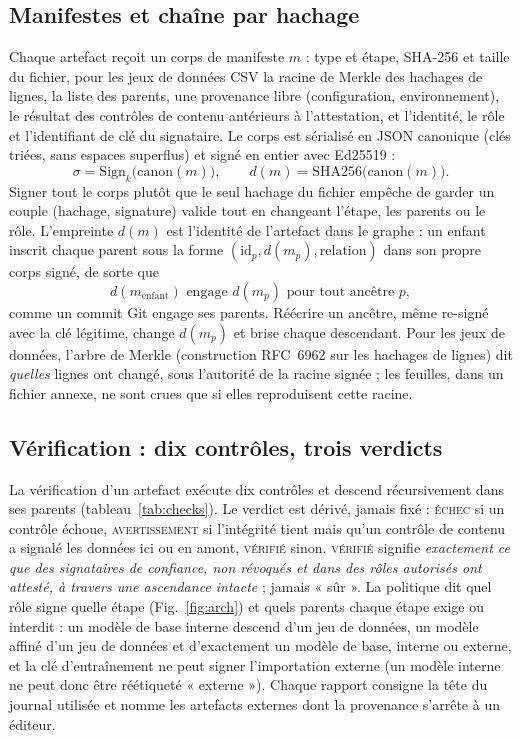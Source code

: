 \documentclass[conference]{IEEEtran}
\newcommand{\st}[1]{\textsc{#1}}
\begin{document}
\subsection{Manifestes et chaîne par hachage}
Chaque artefact reçoit un corps de manifeste $m$ : type et étape, SHA-256 et taille du fichier, pour les jeux de données CSV la racine de Merkle des hachages de lignes, la liste des parents, une provenance libre (configuration, environnement), le résultat des contrôles de contenu antérieurs à l'attestation, et l'identité, le rôle et l'identifiant de clé du signataire. Le corps est sérialisé en JSON canonique (clés triées, sans espaces superflus) et signé en entier avec Ed25519 \cite{rfc8032} :
\begin{equation}
\sigma = \mathrm{Sign}_{k}\bigl(\mathrm{canon}(m)\bigr),\qquad
d(m) = \mathrm{SHA256}\bigl(\mathrm{canon}(m)\bigr).
\label{eq:sign}
\end{equation}
Signer tout le corps plutôt que le seul hachage du fichier empêche de garder un couple (hachage, signature) valide tout en changeant l'étape, les parents ou le rôle. L'empreinte $d(m)$ est l'identité de l'artefact dans le graphe : un enfant inscrit chaque parent sous la forme $(\mathrm{id}_p, d(m_p), \mathrm{relation})$ dans son propre corps signé, de sorte que
\begin{equation}
d(m_{\mathrm{enfant}}) \text{ engage } d(m_p) \text{ pour tout ancêtre } p,
\label{eq:chain}
\end{equation}
comme un commit Git engage ses parents. Réécrire un ancêtre, même re-signé avec la clé légitime, change $d(m_p)$ et brise chaque descendant. Pour les jeux de données, l'arbre de Merkle (construction RFC~6962 \cite{rfc6962} sur les hachages de lignes) dit \emph{quelles} lignes ont changé, sous l'autorité de la racine signée ; les feuilles, dans un fichier annexe, ne sont crues que si elles reproduisent cette racine.

\subsection{Vérification : dix contrôles, trois verdicts}
La vérification d'un artefact exécute dix contrôles et descend récursivement dans ses parents (tableau~\ref{tab:checks}). Le verdict est dérivé, jamais fixé : \st{échec} si un contrôle échoue, \st{avertissement} si l'intégrité tient mais qu'un contrôle de contenu a signalé les données ici ou en amont, \st{vérifié} sinon. \st{vérifié} signifie \emph{exactement ce que des signataires de confiance, non révoqués et dans des rôles autorisés ont attesté, à travers une ascendance intacte} ; jamais « sûr ». La politique dit quel rôle signe quelle étape (Fig.~\ref{fig:arch}) et quels parents chaque étape exige ou interdit : un modèle de base interne descend d'un jeu de données, un modèle affiné d'un jeu de données et d'exactement un modèle de base, interne ou externe, et la clé d'entraînement ne peut signer l'importation externe (un modèle interne ne peut donc être réétiqueté « externe »). Chaque rapport consigne la tête du journal utilisée et nomme les artefacts externes dont la provenance s'arrête à un éditeur.
\end{document}
